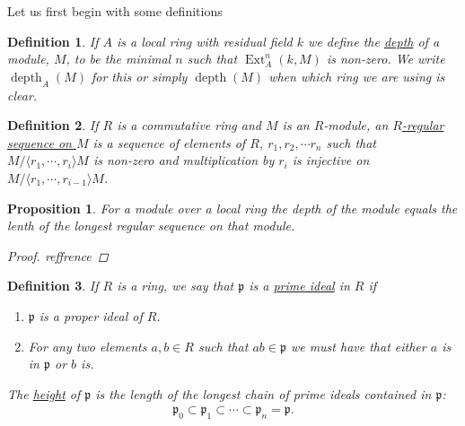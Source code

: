 \documentclass[11pt, a4paper, english]{article}
\newtheorem{prop}{Proposition}
\numberwithin{prop}{section}
\numberwithin{lemma}{section}
\numberwithin{theorem}{section}
\newtheorem{defin}{Definition}
\numberwithin{defin}{section}
\numberwithin{example}{section}
\DeclareMathOperator{\Ext}{Ext}
\DeclareMathOperator{\depth}{depth}
\begin{document}
Let us first begin with some definitions
\begin{defin}
If $A$ is a local ring with residual field $k$ we define the \underline{depth} of a module, $M$, to be the minimal $n$ such that $\Ext^n_A(k, M)$ is non-zero. We write $\depth_A(M)$ for this or simply $\depth(M)$ when which ring we are using is clear.
\end{defin}

\begin{defin}
\label{def:regular_seq}
If $R$ is a commutative ring and $M$ is an $R$-module, an \underline{$R$-regular sequence on $M$} is a sequence of elements of $R$, $r_1, r_2, \cdots r_n$ such that $M/\langle r_1, \cdots, r_i \rangle M$ is non-zero and multiplication by $r_i$ is injective on $M/\langle r_1, \cdots, r_{i-1} \rangle M$.
\end{defin}

\begin{prop}
For a module over a local ring the depth of the module equals the lenth of the longest regular sequence on that module.
\begin{proof}
{\color{red} reffrence}
\end{proof}
\end{prop}

\begin{defin}
If $R$ is a ring, we say that $\mathfrak{p}$ is  a \underline{prime ideal} in $R$ if
\begin{enumerate}
\item $\mathfrak{p}$ is a proper ideal of $R$.
\item For any two elements $a,b \in R$ such that $ab \in \mathfrak{p}$ we must have that either $a$ is in $\mathfrak{p}$ or $b$ is.
\end{enumerate}
The \underline{height} of $\mathfrak{p}$ is the length of the longest chain of prime ideals contained in $\mathfrak{p}$:
\begin{align*}
\mathfrak{p}_0 \subset \mathfrak{p}_1 \subset \cdots \subset \mathfrak{p}_n = \mathfrak{p}.
\end{align*}
\end{defin}
\end{document}
